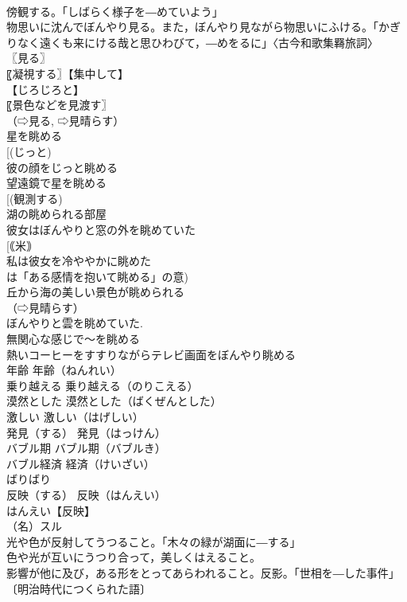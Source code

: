 \documentclass[8pt]{extreport}
\begin{document}
\begin{CJK}{UTF8}{min}
\\	傍観する。「しばらく様子を―めていよう」
\\	物思いに沈んでぼんやり見る。また，ぼんやり見ながら物思いにふける。「かぎりなく遠くも来にける哉と思ひわびて，―めをるに」〈古今和歌集羇旅詞〉
\\	〖見る〗
\\	〖凝視する〗【集中して】
\\	【じろじろと】
\\	〖景色などを見渡す〗
\\	（⇨見る, ⇨見晴らす）
\\	星を眺める
\\	[(じっと) 
\\	彼の顔をじっと眺める
\\	望遠鏡で星を眺める
\\	[(観測する) 
\\	湖の眺められる部屋
\\	彼女はぼんやりと窓の外を眺めていた
\\	[｟米｠ 
\\	私は彼女を冷ややかに眺めた
\\	は「ある感情を抱いて眺める」の意)
\\	丘から海の美しい景色が眺められる
\\	（⇨見晴らす）
\\	ぼんやりと雲を眺めていた.
\\	無関心な感じで～を眺める
\\	熱いコーヒーをすすりながらテレビ画面をぼんやり眺める
\\	年齢		年齢（ねんれい）
\\	乗り越える		乗り越える（のりこえる）
\\	漠然とした		漠然とした（ばくぜんとした）
\\	激しい		激しい（はげしい）
\\	発見（する）		発見（はっけん）
\\	バブル期		バブル期（バブルき）
\\	バブル経済		経済（けいざい）
\\	ばりばり		
\\	反映（する）		反映（はんえい）
\\	はんえい【反映】
\\	（名）スル
\\	光や色が反射してうつること。「木々の緑が湖面に―する」
\\	色や光が互いにうつり合って，美しくはえること。
\\	影響が他に及び，ある形をとってあらわれること。反影。「世相を―した事件」〔明治時代につくられた語〕

\end{CJK}
\end{document}
